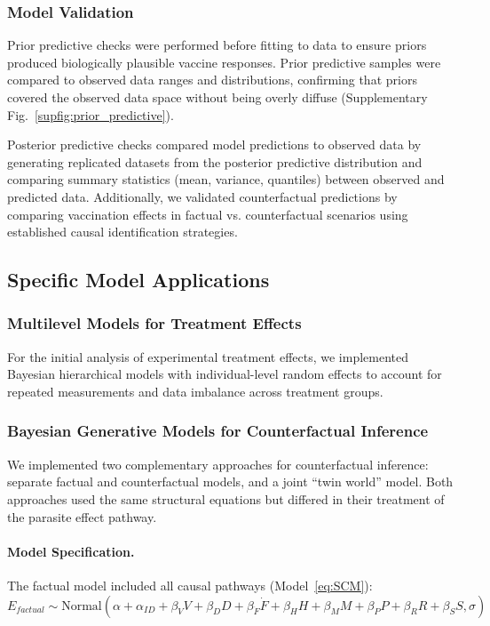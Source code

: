 \documentclass[a4paper, hidelinks, 11pt]{article}
\begin{document}
\begin{appendices}
	\subsubsection{Model Validation}\label{supdata:ModelValidation}

	Prior predictive checks were performed before fitting to data to ensure priors produced biologically plausible vaccine responses. Prior predictive samples were compared to observed data ranges and distributions, confirming that priors covered the observed data space without being overly diffuse (Supplementary Fig.~\ref{supfig:prior_predictive}).

	Posterior predictive checks compared model predictions to observed data by generating replicated datasets from the posterior predictive distribution and comparing summary statistics (mean, variance, quantiles) between observed and predicted data. Additionally, we validated counterfactual predictions by comparing vaccination effects in factual vs. counterfactual scenarios using established causal identification strategies.

	\subsection{Specific Model Applications}\label{supdata:SpecificModels}

	\subsubsection{Multilevel Models for Treatment Effects}\label{supdata:MultilevelModels}

	For the initial analysis of experimental treatment effects, we implemented Bayesian hierarchical models with individual-level random effects to account for repeated measurements and data imbalance across treatment groups.

	\subsubsection{Bayesian Generative Models for Counterfactual Inference}\label{supdata:GenerativeModels}

	We implemented two complementary approaches for counterfactual inference: separate factual and counterfactual models, and a joint ``twin world'' model. Both approaches used the same structural equations but differed in their treatment of the parasite effect pathway.

	\paragraph{Model Specification.} The factual model included all causal pathways (Model~\ref{eq:SCM}):
	$$E_{factual} \sim \text{Normal}(\alpha + \alpha_{ID} + \beta_V V + \beta_D D + \beta_{\dot{F}} \dot{F} + \beta_H H + \beta_M M + \beta_P P + \beta_R R + \beta_S S, \sigma)$$


\end{appendices}
\end{document}
